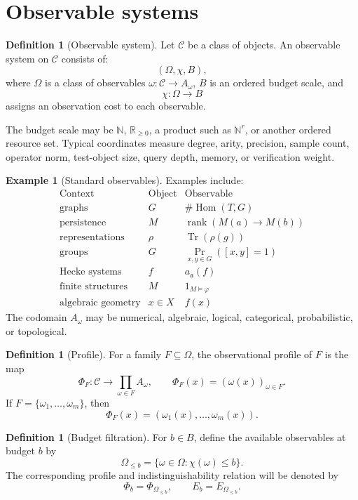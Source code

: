 \documentclass[11pt]{article}
\theoremstyle{definition}
\newtheorem{definition}[theorem]{Definition}
\newtheorem{example}[theorem]{Example}
\theoremstyle{remark}
\begin{document}
\section{Observable systems}

\begin{definition}[Observable system]
Let \(\mathcal C\) be a class of objects.  An observable system on \(\mathcal C\) consists of:
\[
(\Omega,\chi,B),
\]
where \(\Omega\) is a class of observables \(\omega:\mathcal C\to A_\omega\), \(B\) is an ordered budget scale, and
\[
\chi:\Omega\to B
\]
assigns an observation cost to each observable.
\end{definition}

The budget scale may be \(\mathbb N\), \(\mathbb R_{\geq 0}\), a product such as \(\mathbb N^r\), or another ordered resource set.  Typical coordinates measure degree, arity, precision, sample count, operator norm, test-object size, query depth, memory, or verification weight.

\begin{example}[Standard observables]
Examples include:
\[
\begin{array}{c|c|c}
\text{Context} & \text{Object} & \text{Observable}\\
\hline
\text{graphs} & G & \#\operatorname{Hom}(T,G)\\
\text{persistence} & M & \operatorname{rank}(M(a)\to M(b))\\
\text{representations} & \rho & \operatorname{Tr}(\rho(g))\\
\text{groups} & G & \Pr_{x,y\in G}([x,y]=1)\\
\text{Hecke systems} & f & a_{\mathfrak a}(f)\\
\text{finite structures} & M & 1_{M\models\varphi}\\
\text{algebraic geometry} & x\in X & f(x)
\end{array}
\]
The codomain \(A_\omega\) may be numerical, algebraic, logical, categorical, probabilistic, or topological.
\end{example}

\begin{definition}[Profile]
For a family \(F\subseteq\Omega\), the observational profile of \(F\) is the map
\[
\Phi_F:\mathcal C\to \prod_{\omega\in F}A_\omega,\qquad
\Phi_F(x)=(\omega(x))_{\omega\in F}.
\]
If \(F=\{\omega_1,\ldots,\omega_m\}\), then
\[
\Phi_F(x)=(\omega_1(x),\ldots,\omega_m(x)).
\]
\end{definition}

\begin{definition}[Budget filtration]
For \(b\in B\), define the available observables at budget \(b\) by
\[
\Omega_{\leq b}=\{\omega\in\Omega:\chi(\omega)\leq b\}.
\]
The corresponding profile and indistinguishability relation will be denoted by
\[
\Phi_b=\Phi_{\Omega_{\leq b}},\qquad E_b=E_{\Omega_{\leq b}}.
\]
\end{definition}
\end{document}
